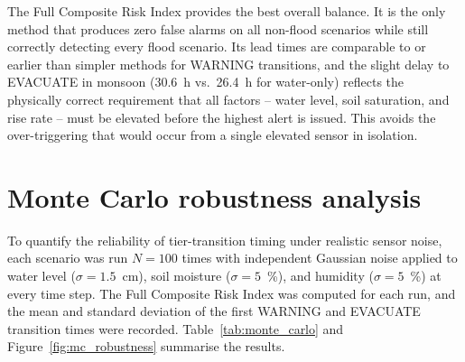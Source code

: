 \documentclass[5p,twocolumn]{elsarticle}
\begin{document}
The Full Composite Risk Index provides the best overall balance. It is the only method that produces zero false alarms on all non-flood scenarios while still correctly detecting every flood scenario. Its lead times are comparable to or earlier than simpler methods for WARNING transitions, and the slight delay to EVACUATE in monsoon (30.6~h vs.~26.4~h for water-only) reflects the physically correct requirement that all factors -- water level, soil saturation, and rise rate -- must be elevated before the highest alert is issued. This avoids the over-triggering that would occur from a single elevated sensor in isolation.

\section{Monte Carlo robustness analysis}

To quantify the reliability of tier-transition timing under realistic sensor noise, each scenario was run $N=100$ times with independent Gaussian noise applied to water level ($\sigma = 1.5$~cm), soil moisture ($\sigma = 5$~\%), and humidity ($\sigma = 5$~\%) at every time step. The Full Composite Risk Index was computed for each run, and the mean and standard deviation of the first WARNING and EVACUATE transition times were recorded. Table~\ref{tab:monte_carlo} and Figure~\ref{fig:mc_robustness} summarise the results.

\begin{table}[htbp]
  \caption{Monte Carlo robustness ($N=100$): tier-transition timing reported as mean $\pm$ standard deviation.}
  \label{tab:monte_carlo}
  \centering
  \footnotesize
  \setlength{\tabcolsep}{2pt}
\end{table}
\end{document}
